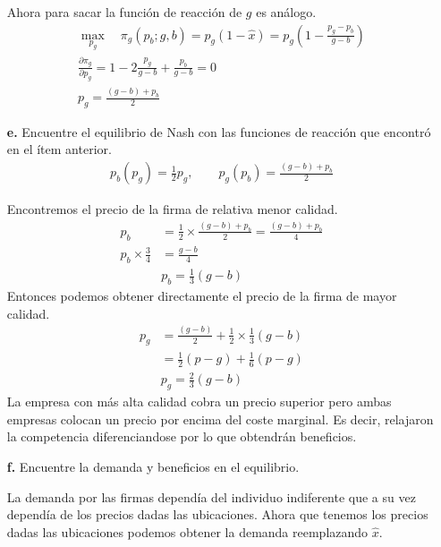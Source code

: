\documentclass{exam}
\begin{document}
\begin{itemize}
\begin{solution}
        Ahora para sacar la función de reacción de $g$ es análogo. 
        \begin{align*}
            \max_{p_g} \quad \pi _g (p_b;g,b) =p_g (1-\hat{x}) = p_g \left( 1 - \frac{p_g-p_b}{g-b}\right) \\
            \frac{\partial \pi_g}{\partial p_g} = 1 - 2\frac{p_g}{g-b} + \frac{p_b}{g-b} = 0 \\
            \boxed{p_g = \frac{(g-b)+p_b}{2}}
        \end{align*}
    \end{solution}
    \item[\textbf{e.}] Encuentre el equilibrio de Nash con las funciones de reacción que encontró en el ítem anterior. 
    \begin{align*}
        p_b(p_g) = \frac{1}{2}p_g, \qquad p_g(p_b) = \frac{(g-b)+p_b}{2}
    \end{align*}
    \begin{solution}
        Encontremos el precio de la firma de relativa menor calidad.
        \begin{align*}
            p_b &= \frac{1}{2}\times \frac{(g-b)+p_b}{2}   = \frac{(g-b)+p_b}{4} \\
            p_b \times \frac{3}{4} &= \frac{g-b}{4} \\
            &\boxed{p_b = \frac{1}{3}(g-b)}
        \end{align*}
        Entonces podemos obtener directamente el precio de la firma de mayor calidad.
        \begin{align*}
            p_g &= \frac{(g-b)}{2} +  \frac{1}{2} \times  \frac{1}{3}(g-b) \\
            &= \frac{1}{2}(p-g) +  \frac{1}{6}(p-g) \\
            &\boxed{p_g = \frac{2}{3}(g-b)}
        \end{align*}
        La empresa con más alta calidad cobra un precio superior pero ambas empresas colocan un precio por encima del coste marginal. Es decir, relajaron la competencia diferenciandose por lo que obtendrán beneficios.
    \end{solution}
    \item[\textbf{f.}] Encuentre la demanda y beneficios en el equilibrio.
    \begin{solution}
        La demanda por las firmas dependía del individuo indiferente que a su vez dependía de los precios dadas las ubicaciones. Ahora que tenemos los precios dadas las ubicaciones podemos obtener la demanda reemplazando $\hat{x}$. \vspace{3mm}


\end{solution}
\end{itemize}
\end{document}
